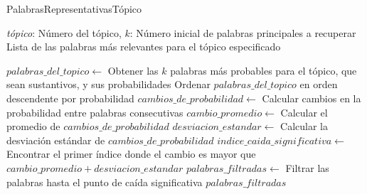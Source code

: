 \documentclass{article}
\begin{document}
%			
%			
	
	\begin{algorithm}
		\caption{PalabrasRepresentativasTópico}
		\begin{algorithmic}[1]
			\scriptsize
			\Require \textit{t\'opico}: Número del tópico, $k$: Número inicial de palabras principales a recuperar
			\Ensure Lista de las palabras más relevantes para el tópico especificado
			
			\State $palabras\_del\_topico \gets$ Obtener las $k$ palabras más probables para el tópico, que sean sustantivos, y sus probabilidades
			\State Ordenar $palabras\_del\_topico$ en orden descendente por probabilidad
			\State $cambios\_de\_probabilidad \gets$ Calcular cambios en la probabilidad entre palabras consecutivas
			\State $cambio\_promedio \gets$ Calcular el promedio de $cambios\_de\_probabilidad$
			\State $desviacion\_estandar \gets$ Calcular la desviación estándar de $cambios\_de\_probabilidad$
			\State $indice\_caida\_significativa \gets$ Encontrar el primer índice donde el cambio es mayor que $cambio\_promedio + desviacion\_estandar$
			\State $palabras\_filtradas \gets$ Filtrar las palabras hasta el punto de caída significativa
			\State \Return $palabras\_filtradas$
			\EndFunction
		\end{algorithmic}
	\end{algorithm}
	
\end{document}
